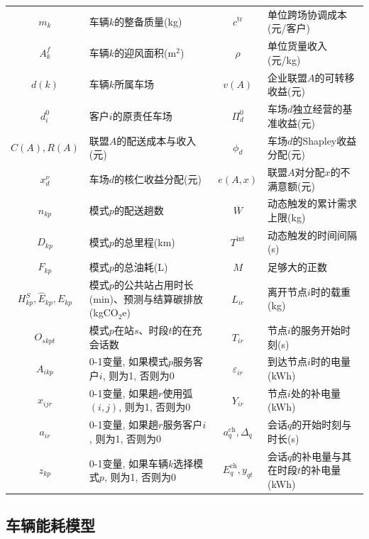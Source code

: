 \documentclass{setp-new}
\begin{document}
\begin{table}[H]
\begin{tabular*}{\linewidth}{@{\extracolsep{\fill}}cJcJ@{}}
$m_k$ & 车辆$k$的整备质量(kg) & $c^{\mathrm{tr}}$ & 单位跨场协调成本(元/客户)\\
$A_k^f$ & 车辆$k$的迎风面积(m$^2$) & $\rho$ & 单位货量收入(元/kg)\\
$d(k)$ & 车辆$k$所属车场 & $v(A)$ & 企业联盟$A$的可转移收益(元)\\
$d_i^0$ & 客户$i$的原责任车场 & $\Pi_d^0$ & 车场$d$独立经营的基准收益(元)\\
$C(A),R(A)$ & 联盟$A$的配送成本与收入(元)
& $\phi_d$ & 车场$d$的Shapley收益分配(元)\\
$x_d^{\nu}$ & 车场$d$的核仁收益分配(元)
& $e(A,x)$ & 联盟$A$对分配$x$的不满意额(元)\\
$n_{kp}$ & 模式$p$的配送趟数 & $\overline W$ & 动态触发的累计需求上限(kg)\\
$D_{kp}$ & 模式$p$的总里程(km) & $T^{\mathrm{int}}$ & 动态触发的时间间隔(s)\\
$F_{kp}$ & 模式$p$的总油耗(L) & $M$ & 足够大的正数\\
$H_{kp}^{S},\widehat E_{kp},E_{kp}$ & 模式$p$的公共站占用时长(min)、预测与结算碳排放(kgCO$_2$e) & $L_{ir}$ & 离开节点$i$时的载重(kg)\\
$O_{skpt}$ & 模式$p$在站$s$、时段$t$的在充会话数 & $T_{ir}$ & 节点$i$的服务开始时刻(s)\\
$A_{ikp}$ & 0-1变量, 如果模式$p$服务客户$i$, 则为1, 否则为0 & $\varepsilon_{ir}$ & 到达节点$i$时的电量(kWh)\\
$x_{ijr}$ & 0-1变量, 如果趟$r$使用弧$(i,j)$, 则为1, 否则为0 & $Y_{ir}$ & 节点$i$处的补电量(kWh)\\
$a_{ir}$ & 0-1变量, 如果趟$r$服务客户$i$, 则为1, 否则为0 & $a_q^{\mathrm{ch}},\Delta_q$ & 会话$q$的开始时刻与时长(s)\\
$z_{kp}$ & 0-1变量, 如果车辆$k$选择模式$p$, 则为1, 否则为0 & $E_q^{\mathrm{ch}},y_{qt}$ & 会话$q$的补电量与其在时段$t$的补电量(kWh)\\
\bottomrule
\end{tabular*}
\end{table}

\subsection{车辆能耗模型}
\end{document}
